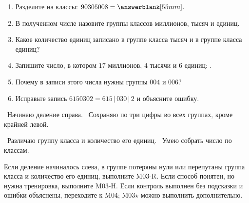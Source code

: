 \begin{checkpointbox}
  \begin{enumerate}[label=\textbf{\arabic*.}]
    \item Разделите на классы: \(90305008=\answerblank[55mm].\)
    \item В полученном числе назовите группы классов миллионов, тысяч и
      единиц.
    \item Какое количество единиц записано в группе класса тысяч и в группе
      класса единиц?
    \item Запишите число, в котором \(17\) миллионов, \(4\) тысячи и \(6\)
      единиц: \answerblank[48mm].
    \item Почему в записи этого числа нужны группы \(004\) и \(006\)?
    \item Исправьте запись \(6150302=615\,|\,030\,|\,2\) и объясните ошибку.
  \end{enumerate}
\end{checkpointbox}

\begin{reflectionbox}
  \choicebox\ Начинаю деление справа.
  \quad
  \choicebox\ Сохраняю по три цифры во всех группах, кроме крайней левой.

  \choicebox\ Различаю группу класса и количество его единиц.
  \quad
  \choicebox\ Умею собрать число по классам.
\end{reflectionbox}

\begin{notebox}
  Если деление начиналось слева, в группе потеряны нули или перепутаны группа
  класса и количество его единиц, выполните M03-R. Если способ понятен, но
  нужна тренировка, выполните M03-H. Если контроль выполнен без подсказки и
  ошибки объяснены, переходите к M04; M03\(\star\) можно выполнить дополнительно.
\end{notebox}
